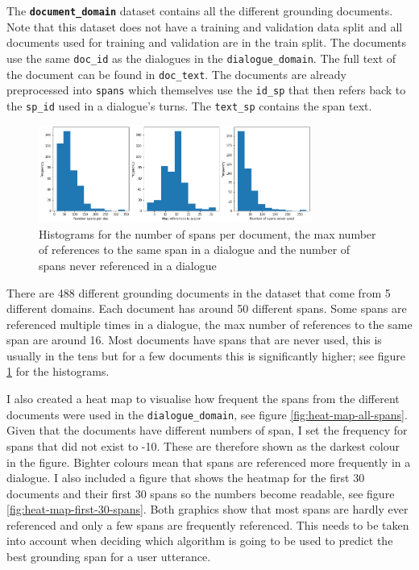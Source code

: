 \documentclass[11pt]{article}
\begin{document}
    The \textbf{\texttt{document\_domain}} dataset contains all the different grounding documents. Note that this dataset does not have
    a training and validation data split and all documents used for training and validation are in the train split.
    The documents use the same \texttt{doc\_id} as the dialogues in the \texttt{dialogue\_domain}. The full text of the document
    can be found in \texttt{doc\_text}. The documents are already preprocessed into \texttt{spans} which themselves
    use the \texttt{id\_sp} that then refers back to the \texttt{sp\_id} used in a dialogue's turns. The \texttt{text\_sp}
    contains the span text.

    \begin{figure}[h]
        \centering
        \includegraphics[width=0.8\textwidth]{span_counts}
        \caption{Histograms for the number of spans per document, the max number of references to the same span in a dialogue and the number of
        spans never referenced in a dialogue }
        \label{fig:histogram-spans}
    \end{figure}

    There are 488 different grounding documents in the dataset that come from 5 different domains. Each document has
    around 50 different spans. Some spans are referenced multiple times in a dialogue, the max number of references
    to the same span are around 16. Most documents have spans that are never used, this is usually in the tens but for a few documents
    this is significantly higher; see figure \ref{fig:histogram-spans} for the histograms.

    I also created a heat map to visualise how frequent the spans from the different documents were used in the \texttt{dialogue\_domain},
    see figure \ref{fig:heat-map-all-spans}. Given that the documents have different numbers of span, I set the frequency for spans that did not exist to -10. These
    are therefore shown as the darkest colour in the figure. Bighter colours mean that spans are referenced more frequently in a
    dialogue. I also included a figure that shows the heatmap for the first 30 documents and their first 30 spans
    so the numbers become readable, see figure \ref{fig:heat-map-first-30-spans}. Both graphics show that most spans
    are hardly ever referenced and only a few spans are frequently referenced. This needs to be taken into account when
    deciding which algorithm is going to be used to predict the best grounding span for a user utterance.
\end{document}
